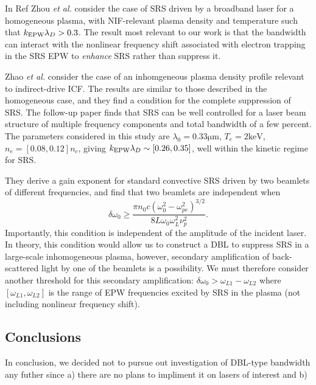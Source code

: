 In Ref \cite{zhou_kinetic_2018} Zhou \textit{et al.} consider the case of SRS
driven by a broadband laser for a homogeneous plasma, with NIF-relevant plasma
density and temperature such that $k_\mathrm{EPW}\lambda_D > 0.3$. The result most relevant to our
work is that the bandwidth can interact with the nonlinear frequency shift associated
with electron trapping in the SRS EPW to \emph{enhance} SRS rather than suppress it.



Zhao \textit{et al.} \cite{zhao_effective_2017} consider the case of an
inhomgeneous plasma density profile relevant to indirect-drive ICF. The results
are similar to those described in the homogeneous case, and they find a
condition for the complete suppression of SRS. The follow-up paper
\cite{zhao_suppression_2019} finds that SRS can be well controlled for a laser
beam structure of multiple frequency components and total bandwidth of a few
percent. The parameters considered in this study are
$\lambda_0=0.33\si{\micro\metre}$,
$T_e=2\si{\kilo\electronvolt}$, $n_e = [0.08,0.12]n_c$, giving $k_\mathrm{EPW}\lambda_D \sim
[0.26,0.35]$, well within the kinetic regime for SRS.

They derive a gain exponent for standard convective SRS driven by two
beamlets of different frequencies, and find that two beamlets are independent
when
\begin{equation}\label{DLB_threshold_inhomo}
\delta \omega_{0} \geq \frac{\pi n_{0} c\left(\omega_{0}^{2}-\omega_{p
e}^{2}\right)^{3 / 2}}{8 L \omega_{0} \omega_{L}^{2} \nu_{p}^{2}}.
\end{equation}
Importantly, this condition is independent of the amplitude of the incident
laser. In theory, this condition would allow us to construct a DBL to suppress
SRS in a large-scale inhomogeneous plasma, however, secondary amplification of
back-scattered light by one of the beamlets is a possibility. We must therefore
consider another threshold for this secondary amplification: $\delta\omega_0 >
\omega_{L1}-\omega_{L2}$ where $[\omega_{L1},\omega_{L2}]$ is the range of EPW
frequencies excited by SRS in the plasma (not including nonlinear frequency
shift).


\subsection{Conclusions}
In conclusion, we decided not to pursue out investigation of DBL-type bandwidth any futher since a) there are no plans to impliment it on lasers of interest and b) 


